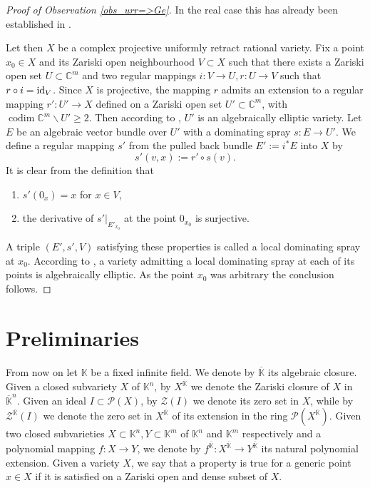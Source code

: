 \documentclass{amsart}
\theoremstyle{plain}
\theoremstyle{definition}
\theoremstyle{remark}
\numberwithin{equation}{section}
\newcommand{\C}{\mathbb{C}}
\newcommand{\K}{\mathbb{K}}
\newcommand{\PP}{\mathcal{P}}
\newcommand{\Z}{\mathcal{Z}}
\newcommand{\id}{\textnormal{id}}
\DeclareMathOperator{\codim}{codim}
\begin{document}
\begin{proof}[Proof of Observation \ref{obs_urr=>Ge}]
In the real case this has already been established in \cite[Theorem 2.11]{RelativeSW}.

Let then $X$ be a complex projective uniformly retract rational variety. Fix a point $x_0\in X$ and its Zariski open neighbourhood $V\subset X$ such that there exists a Zariski open set $U\subset \C^m$ and two regular mappings $i:V\rightarrow U,r:U\rightarrow V$ such that $r\circ i=\id_V$. Since $X$ is projective, the mapping $r$ admits an extension to a regular mapping $r':U'\rightarrow X$ defined on a Zariski open set $U'\subset\C^m$, with $\codim \C^m\backslash U'\geq 2$. Then according to \cite[Proposition 6.4.1]{forstneric}, $U'$ is an algebraically elliptic variety. Let $E$ be an algebraic vector bundle over $U'$ with a dominating spray $s:E\rightarrow U'$. We define a regular mapping $s'$ from the pulled back bundle $E':=i^\ast E$ into $X$ by
\begin{equation*}
    s'(v,x):=r'\circ s(v).
\end{equation*}
It is clear from the definition that 
\begin{enumerate}
    \item $s'(0_x)=x$ for $x\in V$,
    \item the derivative of $s'\vert_{E'_{x_0}}$ at the point $0_{x_0}$ is surjective.
\end{enumerate}
 
A triple $(E',s',V)$ satisfying these properties is called a local dominating spray at $x_0$. According to \cite[Theorem 1.1]{Zaidenberg2}, a variety admitting a local dominating spray at each of its points is algebraically elliptic. As the point $x_0$ was arbitrary the conclusion follows.
\end{proof}

\section{Preliminaries}
From now on let $\K$ be a fixed infinite field. We denote by $\overline{\K}$ its algebraic closure. Given a closed subvariety $X$ of $\K^n$, by $X^{\overline{\K}}$ we denote the Zariski closure of $X$ in $\overline{\K}^n$. Given an ideal $I\subset \PP(X)$, by $\Z(I)$ we denote its zero set in $X$, while by $\Z^{\overline{\K}}(I)$ we denote the zero set in $X^{\overline{\K}}$ of its extension in the ring $\PP(X^{\overline{\K}})$. Given two closed subvarieties $X\subset \K^n,Y\subset \K^m$ of $\K^n$ and $\K^m$ respectively and a polynomial mapping $f:X\rightarrow Y$, we denote by $f^{\overline{\K}}:X^{\overline{\K}}\rightarrow Y^{\overline{\K}}$ its natural polynomial extension. Given a variety $X$, we say that a property is true for a generic point $x\in X$ if it is satisfied on a Zariski open and dense subset of $X$.
\end{document}
